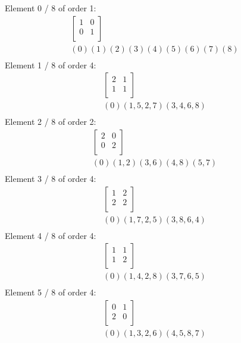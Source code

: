 Element     0 / 8 of order 1:
$$
\begin{array}{c}
\left[
\begin{array}{*{2}{r}}
1 & 0\\
0 & 1\\
\end{array}
\right]
\\
(0)(1)(2)(3)(4)(5)(6)(7)(8)\\
\end{array}
$$
Element     1 / 8 of order 4:
$$
\begin{array}{c}
\left[
\begin{array}{*{2}{r}}
2 & 1\\
1 & 1\\
\end{array}
\right]
\\
(0)(1, 5, 2, 7)(3, 4, 6, 8)\\
\end{array}
$$
Element     2 / 8 of order 2:
$$
\begin{array}{c}
\left[
\begin{array}{*{2}{r}}
2 & 0\\
0 & 2\\
\end{array}
\right]
\\
(0)(1, 2)(3, 6)(4, 8)(5, 7)\\
\end{array}
$$
Element     3 / 8 of order 4:
$$
\begin{array}{c}
\left[
\begin{array}{*{2}{r}}
1 & 2\\
2 & 2\\
\end{array}
\right]
\\
(0)(1, 7, 2, 5)(3, 8, 6, 4)\\
\end{array}
$$
Element     4 / 8 of order 4:
$$
\begin{array}{c}
\left[
\begin{array}{*{2}{r}}
1 & 1\\
1 & 2\\
\end{array}
\right]
\\
(0)(1, 4, 2, 8)(3, 7, 6, 5)\\
\end{array}
$$
Element     5 / 8 of order 4:
$$
\begin{array}{c}
\left[
\begin{array}{*{2}{r}}
0 & 1\\
2 & 0\\
\end{array}
\right]
\\
(0)(1, 3, 2, 6)(4, 5, 8, 7)\\
\end{array}
$$
